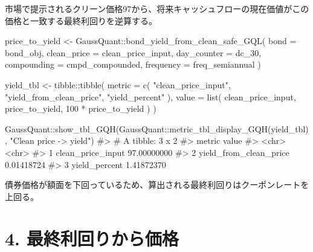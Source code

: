 \documentclass[
  letterpaper,
  DIV=11,
  numbers=noendperiod]{scrreprt}
\newenvironment{Shaded}{\begin{snugshade}}{\end{snugshade}}
\newcommand{\AttributeTok}[1]{\textcolor[rgb]{0.40,0.45,0.13}{#1}}
\newcommand{\CommentTok}[1]{\textcolor[rgb]{0.37,0.37,0.37}{#1}}
\newcommand{\DecValTok}[1]{\textcolor[rgb]{0.68,0.00,0.00}{#1}}
\newcommand{\FunctionTok}[1]{\textcolor[rgb]{0.28,0.35,0.67}{#1}}
\newcommand{\NormalTok}[1]{\textcolor[rgb]{0.00,0.23,0.31}{#1}}
\newcommand{\OtherTok}[1]{\textcolor[rgb]{0.00,0.23,0.31}{#1}}
\newcommand{\SpecialCharTok}[1]{\textcolor[rgb]{0.37,0.37,0.37}{#1}}
\newcommand{\StringTok}[1]{\textcolor[rgb]{0.13,0.47,0.30}{#1}}
\begin{document}
市場で提示されるクリーン価格97から、将来キャッシュフローの現在価値がこの価格と一致する最終利回りを逆算する。

\begin{Shaded}
\begin{Highlighting}[]
\NormalTok{price\_to\_yield }\OtherTok{\textless{}{-}}\NormalTok{ GaussQuant}\SpecialCharTok{::}\FunctionTok{bond\_yield\_from\_clean\_safe\_GQL}\NormalTok{(}
  \AttributeTok{bond =}\NormalTok{ bond\_obj,}
  \AttributeTok{clean\_price =}\NormalTok{ clean\_price\_input,}
  \AttributeTok{day\_counter =}\NormalTok{ dc\_30,}
  \AttributeTok{compounding =}\NormalTok{ cmpd\_compounded,}
  \AttributeTok{frequency =}\NormalTok{ freq\_semiannual}
\NormalTok{)}

\NormalTok{yield\_tbl }\OtherTok{\textless{}{-}}\NormalTok{ tibble}\SpecialCharTok{::}\FunctionTok{tibble}\NormalTok{(}
  \AttributeTok{metric =} \FunctionTok{c}\NormalTok{(}
    \StringTok{"clean\_price\_input"}\NormalTok{,}
    \StringTok{"yield\_from\_clean\_price"}\NormalTok{,}
    \StringTok{"yield\_percent"}
\NormalTok{  ),}
  \AttributeTok{value =} \FunctionTok{list}\NormalTok{(}
\NormalTok{    clean\_price\_input,}
\NormalTok{    price\_to\_yield,}
    \DecValTok{100} \SpecialCharTok{*}\NormalTok{ price\_to\_yield}
\NormalTok{  )}
\NormalTok{)}

\NormalTok{GaussQuant}\SpecialCharTok{::}\FunctionTok{show\_tbl\_GQH}\NormalTok{(GaussQuant}\SpecialCharTok{::}\FunctionTok{metric\_tbl\_display\_GQH}\NormalTok{(yield\_tbl), }\StringTok{"Clean price {-}\textgreater{} yield"}\NormalTok{)}
\CommentTok{\#\textgreater{} \# A tibble: 3 x 2}
\CommentTok{\#\textgreater{}   metric                 value      }
\CommentTok{\#\textgreater{}   \textless{}chr\textgreater{}                  \textless{}chr\textgreater{}      }
\CommentTok{\#\textgreater{} 1 clean\_price\_input      97.00000000}
\CommentTok{\#\textgreater{} 2 yield\_from\_clean\_price 0.01418724 }
\CommentTok{\#\textgreater{} 3 yield\_percent          1.41872370}
\end{Highlighting}
\end{Shaded}

債券価格が額面を下回っているため、算出される最終利回りはクーポンレートを上回る。

\section{4.
最終利回りから価格}\label{ux6700ux7d42ux5229ux56deux308aux304bux3089ux4fa1ux683c}
\end{document}
